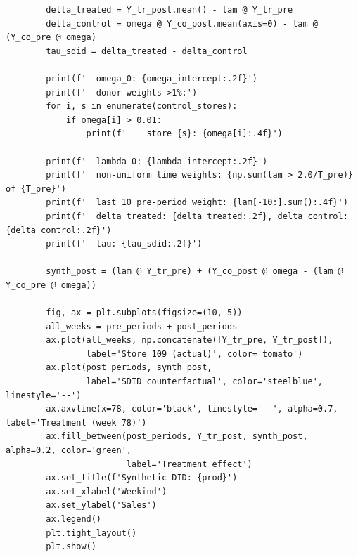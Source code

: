 \documentclass[10pt]{article}
\begin{document}
\begin{lstlisting}
        delta_treated = Y_tr_post.mean() - lam @ Y_tr_pre
        delta_control = omega @ Y_co_post.mean(axis=0) - lam @ (Y_co_pre @ omega)
        tau_sdid = delta_treated - delta_control

        print(f'  omega_0: {omega_intercept:.2f}')
        print(f'  donor weights >1%:')
        for i, s in enumerate(control_stores):
            if omega[i] > 0.01:
                print(f'    store {s}: {omega[i]:.4f}')

        print(f'  lambda_0: {lambda_intercept:.2f}')
        print(f'  non-uniform time weights: {np.sum(lam > 2.0/T_pre)} of {T_pre}')
        print(f'  last 10 pre-period weight: {lam[-10:].sum():.4f}')
        print(f'  delta_treated: {delta_treated:.2f}, delta_control: {delta_control:.2f}')
        print(f'  tau: {tau_sdid:.2f}')

        synth_post = (lam @ Y_tr_pre) + (Y_co_post @ omega - (lam @ Y_co_pre @ omega))

        fig, ax = plt.subplots(figsize=(10, 5))
        all_weeks = pre_periods + post_periods
        ax.plot(all_weeks, np.concatenate([Y_tr_pre, Y_tr_post]),
                label='Store 109 (actual)', color='tomato')
        ax.plot(post_periods, synth_post,
                label='SDID counterfactual', color='steelblue', linestyle='--')
        ax.axvline(x=78, color='black', linestyle='--', alpha=0.7, label='Treatment (week 78)')
        ax.fill_between(post_periods, Y_tr_post, synth_post, alpha=0.2, color='green',
                        label='Treatment effect')
        ax.set_title(f'Synthetic DID: {prod}')
        ax.set_xlabel('Weekind')
        ax.set_ylabel('Sales')
        ax.legend()
        plt.tight_layout()
        plt.show()
\end{lstlisting}
\end{document}
